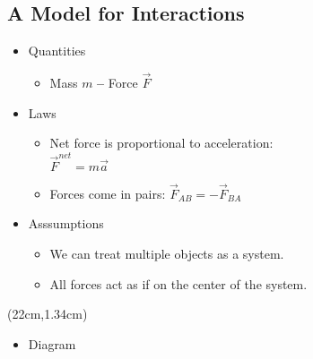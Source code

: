 \documentclass[]{article}
\begin{document}
\newpage
\begin{TeacherMargin}

\end{TeacherMargin}
\begin{PresentSpace}
\vspace{-10pt}
\section*{A Model for Interactions}
\vspace{-10pt}
\begin{itemize}
	\item Quantities
	\begin{itemize}
		\item Mass \quad $m$ \qquad \textbf{--} Force \quad $\vec{F}$
	\end{itemize}
	\item Laws
	\begin{itemize}
		\item Net force is proportional to acceleration: \\
		$\vec{F}^{net}=m\vec{a}$
		\item Forces come in pairs: $\vec{F}_{AB} = -\vec{F}_{BA}$
	\end{itemize}
	\item Asssumptions
	\begin{itemize}
		\item We can treat multiple objects as a system.
		\item All forces act as if on the center of the system.
	\end{itemize}
\end{itemize}
\end{PresentSpace}
\begin{textblock*}{5cm}(22cm,1.34cm)
\Large
\begin{itemize}
	\item Diagram
\end{itemize}
\centering
{}
\end{textblock*}
\end{document}

